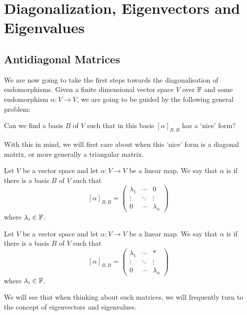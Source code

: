 \documentclass[a4paper]{scrartcl}
\begin{document}
\section{Diagonalization, Eigenvectors and Eigenvalues}


\subsection{Antidiagonal Matrices}

We are now going to take the first steps towards the diagonalisation of endomorphisms. 
Given a finite dimensional vector space $V$ over $\mathbb{F}$ and some endomorphism $\alpha: V \rightarrow V$, we are going to be guided by the following general problem:
\begin{center}\color{blue}
    Can we find a basis $B$ of $V$ such that in this basis $[\alpha]_{B, B}$ has a `nice' form?
\end{center}
With this in mind, we will first care about when this `nice' form is a diagonal matrix, or more generally a triangular matrix.


\begin{definition}[Diagonalizable]
    Let $V$ be a vector space and let $\alpha: V \rightarrow V$ be a linear map. We say that $\alpha$ is  if there is a basis $B$ of $V$ such that
    $$
    [\alpha]_{B, B} = \begin{pmatrix}
        \lambda_1 & \cdots & 0 \\
        \vdots & \ddots & \vdots \\
        0 & \cdots & \lambda_n
    \end{pmatrix}
    $$
    where $\lambda_i \in \mathbb{F}$.
\end{definition}

\begin{definition}[Triangulable]    
    Let $V$ be a vector space and let $\alpha: V \rightarrow V$ be a linear map. We say that $\alpha$ is  if there is a basis $B$ of $V$ such that
    $$
    [\alpha]_{B, B} = \begin{pmatrix}
        \lambda_1 & \cdots & * \\
        \vdots & \ddots & \vdots \\
        0 & \cdots & \lambda_n
    \end{pmatrix}
    $$
    where $\lambda_i \in \mathbb{F}$. 
\end{definition}


We will see that when thinking about such matrices, we will frequently turn to the concept of eigenvectors and eigenvalues.
\end{document}
